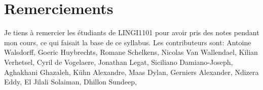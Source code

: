 \section*{Remerciements}

Je tiens à remercier les étudiants de LINGI1101 pour avoir pris des
notes pendant mon cours, ce qui faisait la base de ce syllabus.  Les
contributeurs sont:
Antoine Walsdorff,
Goeric Huybrechts,
Romane Schelkens,
Nicolas Van Wallendael, %
Kilian Verhetsel,
Cyril de Vogelaere,
Jonathan Legat, %
Siciliano Damiano-Joseph,
Aghakhani Ghazaleh,
Kühn Alexandre,
Maas Dylan, %
Gerniers Alexander,
Ndizera Eddy,
El Jilali Solaiman,
Dhillon Sundeep, %


